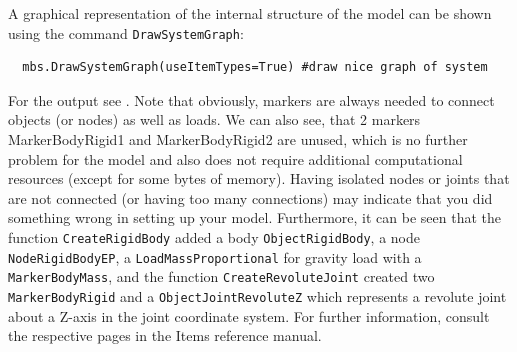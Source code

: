 \noindent A graphical representation of the internal structure of the model can be shown using the command \texttt{DrawSystemGraph}:
\pythonstyle\begin{lstlisting}
  mbs.DrawSystemGraph(useItemTypes=True) #draw nice graph of system
\end{lstlisting}
For the output see . Note that obviously, markers are always needed to connect objects (or nodes) as well as loads. We can also see, that 2 markers MarkerBodyRigid1 and MarkerBodyRigid2 are unused, which is no further problem for the model and also does not require additional computational resources (except for some bytes of memory). Having isolated nodes or joints that are not connected (or having too many connections) may indicate that you did something wrong in setting up your model.
Furthermore, it can be seen that the function \texttt{CreateRigidBody} added a body \texttt{ObjectRigidBody}, a node \texttt{NodeRigidBodyEP}, a \texttt{LoadMassProportional} for gravity load with a \texttt{MarkerBodyMass}, and the function \texttt{CreateRevoluteJoint} created two \texttt{MarkerBodyRigid} and a \texttt{ObjectJointRevoluteZ} which represents a revolute joint about a Z-axis in the joint coordinate system. For further information, consult the respective pages in the Items reference manual.
%

